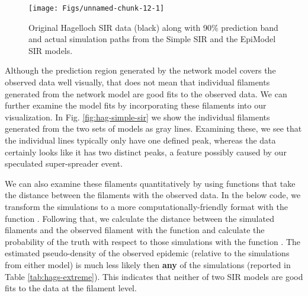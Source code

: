 \documentclass[
  shortnames]{jss}
\begin{document}
\begin{CodeChunk}
\begin{figure}[H]

{\centering \texttt{[image: Figs/unnamed-chunk-12-1]} 

}

\caption{\label{fig:hag-simple-sir}  Original Hagelloch SIR data (black) along with 90\% prediction band and actual simulation paths from the Simple SIR and the EpiModel SIR models.}\label{fig:unnamed-chunk-12}
\end{figure}
\end{CodeChunk}

Although the prediction region generated by the network model covers the
observed data well visually, that does not mean that individual
filaments generated from the network model are good fits to the observed
data. We can further examine the model fits by incorporating these
filaments into our visualization. In Fig. \ref{fig:hag-simple-sir} we
show the individual filaments generated from the two sets of models as
gray lines. Examining these, we see that the individual lines typically
only have one defined peak, whereas the data certainly looks like it has
two distinct peaks, a feature possibly caused by our speculated
super-spreader event.

We can also examine these filaments quantitatively by using functions
that take the distance between the filaments with the observed data. In
the below code, we transform the simulations to a more
computationally-friendly format with the function
. Following that, we calculate the distance
between the simulated filaments and the observed filament with the
function  and calculate the
probability of the truth with respect to those simulations with the
function . The estimated
pseudo-density of the observed epidemic (relative to the simulations
from either model) is much less likely then \textbf{any} of the
simulations (reported in Table \ref{tab:hags-extreme}). This indicates
that neither of two SIR models are good fits to the data at the filament
level.
\end{document}
